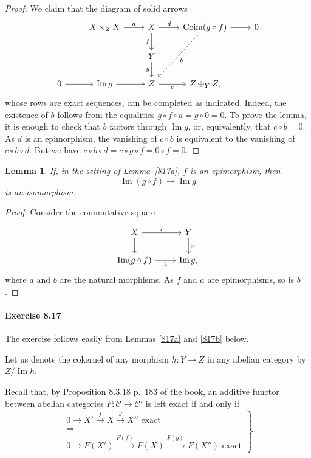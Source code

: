 \documentclass[12pt]{article}
\newtheorem{lem}[thm]{Lemma}
\theoremstyle{remark}
\theoremstyle{definition}
\newcommand{\C}{\mathcal C}
\newcommand{\then}{\Rightarrow}
\newcommand{\xr}{\xrightarrow}
\DeclareMathOperator{\Coim}{Coim}
\DeclareMathOperator{\Ima}{Im}
\begin{document}
\begin{proof} 
We claim that the diagram of solid arrows 
$$
\begin{tikzcd}
{}&X\times_ZX\ar{r}{a}&X\ar{d}[swap]{f}\ar{r}{d}&\Coim(g\circ f)\ar{r}\ar[dashed]{ddl}{b}&0\\ 
{}&{}&Y\ar{d}[swap]{g}\\
0\ar{r}&\Ima g\ar{r}&Z\ar{r}[swap]{c}&Z\oplus_YZ,
\end{tikzcd}
$$ 
whose rows are exact sequences, can be completed as indicated. Indeed, the existence of $b$ follows from the equalities $g\circ f\circ a=g\circ0=0$. To prove the lemma, it is enough to check that $b$ factors through $\Ima g$, or, equivalently, that $c\circ b=0$. As $d$ is an epimorphism, the vanishing of $c\circ b$ is equivalent to the vanishing of $c\circ b\circ d$. But we have $c\circ b\circ d=c\circ g\circ f=0\circ f=0$. 
\end{proof}

\begin{lem}\label{817b1} 
If, in the setting of Lemma~\ref{817a}, $f$ is an epimorphism, then 
$$
\Ima(g\circ f)\to\Ima g
$$ 
is an isomorphism. 
\end{lem} 

\begin{proof} 
Consider the commutative square  
$$
\begin{tikzcd}
X\ar{d}\ar{r}{f}&Y\ar{d}{a}\\ 
\Ima(g\circ f)\ar{r}[swap]{b}&\Ima g,
\end{tikzcd}
$$ 
where $a$ and $b$ are the natural morphisms. As $f$ and $a$ are epimorphisms, so is $b$. 
\end{proof} 


\paragraph{Exercise 8.17}

The exercise follows easily from Lemmas \ref{817a} and \ref{817b} below.

Let us denote the cokernel of any morphism $h:Y\to Z$ in any abelian category by $Z/\Ima h$. 

Recall that, by Proposition 8.3.18 p.~183 of the book, an additive functor between abelian categories $F:\C\to\C'$ is left exact if and only if
%
\begin{equation}\label{sex1}
\left.
\begin{matrix}
0\to X'\xr fX\xr gX''\text{ exact }\\ 
\then\\ 
0\to F(X')\overset{F(f)\ }{\longrightarrow}F(X)\overset{F(g)\ }{\longrightarrow}F(X'')\text{ exact}
\end{matrix}
\right\}
\end{equation}
\end{document}

